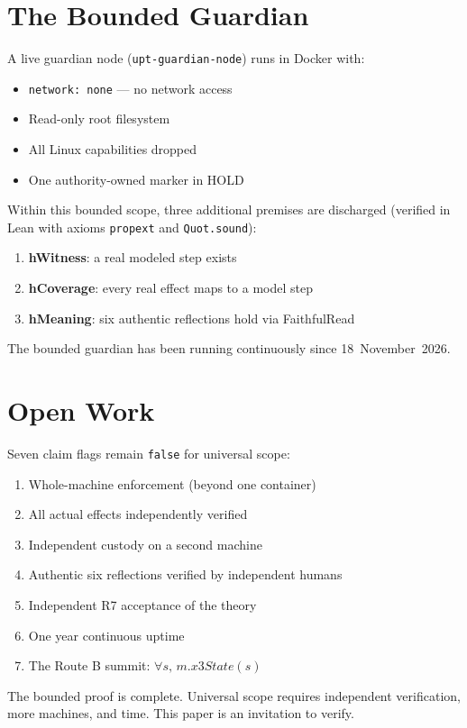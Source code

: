 \documentclass[12pt,a4paper]{article}
\begin{document}
\section{The Bounded Guardian}

A live guardian node (\texttt{upt-guardian-node}) runs in Docker with:
\begin{itemize}[nosep]
\item \texttt{network: none} --- no network access
\item Read-only root filesystem
\item All Linux capabilities dropped
\item One authority-owned marker in HOLD
\end{itemize}

Within this bounded scope, three additional premises are discharged
(verified in Lean with axioms \texttt{propext} and \texttt{Quot.sound}):
\begin{enumerate}[nosep]
\item \textbf{hWitness}: a real modeled step exists
\item \textbf{hCoverage}: every real effect maps to a model step
\item \textbf{hMeaning}: six authentic reflections hold via FaithfulRead
\end{enumerate}

The bounded guardian has been running continuously since 18~November~2026.

\section{Open Work}

Seven claim flags remain \texttt{false} for universal scope:
\begin{enumerate}[nosep]
\item Whole-machine enforcement (beyond one container)
\item All actual effects independently verified
\item Independent custody on a second machine
\item Authentic six reflections verified by independent humans
\item Independent R7 acceptance of the theory
\item One year continuous uptime
\item The Route B summit: $\forall s,\, m.\mathit{x3State}(s)$
\end{enumerate}

The bounded proof is complete. Universal scope requires independent
verification, more machines, and time. This paper is an invitation
to verify.
\end{document}
